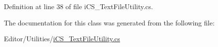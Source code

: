 Definition at line 38 of file i\+C\+S\+\_\+\+Text\+File\+Utility.\+cs.



The documentation for this class was generated from the following file\+:\begin{DoxyCompactItemize}
\item 
Editor/\+Utilities/\hyperlink{i_c_s___text_file_utility_8cs}{i\+C\+S\+\_\+\+Text\+File\+Utility.\+cs}\end{DoxyCompactItemize}
